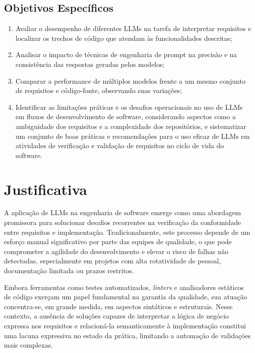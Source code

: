 \subsection{Objetivos Específicos}
\begin{enumerate}
    \item Avaliar o desempenho de diferentes LLMs na tarefa de interpretar requisitos e localizar os trechos de código que atendam às funcionalidades descritas;
    
    \item Analisar o impacto de técnicas de engenharia de prompt na precisão e na consistência das respostas geradas pelos modelos;
    
    \item Comparar a performance de múltiplos modelos frente a um mesmo conjunto de requisitos e código-fonte, observando suas variações;
    
    \item Identificar as limitações práticas e os desafios operacionais no uso de LLMs em fluxos de desenvolvimento de software, considerando aspectos como a ambiguidade dos requisitos e a complexidade dos repositórios, e sistematizar um conjunto de boas práticas e recomendações para o uso eficaz de LLMs em atividades de verificação e validação de requisitos no ciclo de vida do software.
\end{enumerate}

\section{Justificativa}

A aplicação de LLMs na engenharia de software emerge como uma abordagem promissora para solucionar desafios recorrentes na verificação da conformidade entre requisitos e implementação. Tradicionalmente, este processo depende de um esforço manual significativo por parte das equipes de qualidade, o que pode comprometer a agilidade do desenvolvimento e elevar o risco de falhas não detectadas, especialmente em projetos com alta rotatividade de pessoal, documentação limitada ou prazos restritos.

Embora ferramentas como testes automatizados, \textit{linters} e analisadores estáticos de código exerçam um papel fundamental na garantia da qualidade, sua atuação concentra-se, em grande medida, em aspectos sintáticos e estruturais. Nesse contexto, a ausência de soluções capazes de interpretar a lógica de negócio expressa nos requisitos e relacioná-la semanticamente à implementação constitui uma lacuna expressiva no estado da prática, limitando a automação de validações mais complexas.

